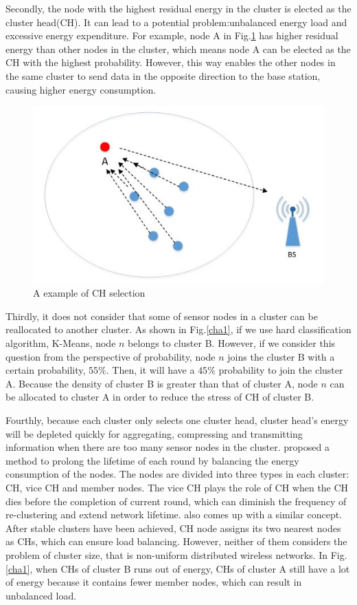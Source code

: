 \documentclass[11pt]{report}
\begin{document}
	\noindent Secondly, the node with the highest residual energy in the cluster is elected as the cluster head(CH). It can lead to a potential problem:unbalanced energy load and excessive energy expenditure. For example, node A in Fig.\ref {cha} has higher residual energy than other nodes in the cluster, which means node A can be elected as the CH with the highest probability. However, this way enables the other nodes in the same cluster to send data in the opposite direction to the base station, causing higher energy consumption. 
	\begin{figure}[!h]
		\centering
		\includegraphics[width=0.6\linewidth]{cha.jpg}
		\caption{A example of CH selection}
		\label{cha}
	\end{figure}
	
	\noindent Thirdly, it does not consider that some of sensor nodes in a cluster can be reallocated to another cluster. As shown in Fig.\ref{cha1}, if we use hard classification algorithm, K-Means, node $n$ belongs to cluster B. However, if we consider this question from the perspective of probability, node $n$ joins the cluster B with a certain probability, $55\%$. Then, it will have a $45\%$ probability to join the cluster A. Because the density of cluster B is greater than that of cluster A, node $n$ can be allocated to cluster A in order to reduce the stress of CH of cluster B. 
	
	\noindent Fourthly, because each cluster only selects one cluster head, cluster head's energy will be depleted quickly for aggregating, compressing and transmitting information when there are too many sensor nodes in the cluster. \cite{Sangameswaran} proposed a method to prolong the lifetime of each round by balancing the energy consumption of the nodes. The nodes are divided into three types in each cluster: CH, vice CH and member nodes. The vice CH plays the role of CH when the CH dies before the completion of current round, which can diminish the frequency of re-clustering and extend network lifetime. \cite{doi:10.1155/2016/5040475} also comes up with a similar concept. After stable clusters have been achieved, CH node assigns its two nearest nodes as CHs, which can ensure load balancing. However, neither of them considers the problem of cluster size, that is non-uniform distributed wireless networks. In Fig.\ref{cha1}, when CHs of cluster B runs out of energy, CHs of cluster A still have a lot of energy because it contains fewer member nodes, which can result in unbalanced load.\\
	
\end{document}
